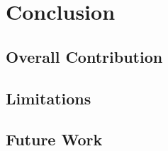 \chapter{Conclusion}
\label{ch:conclusion}

\section{Overall Contribution}
\label{sec:overall-contribution}

\section{Limitations}
\label{sec:limitations}

\section{Future Work}
\label{sec:future-work}
